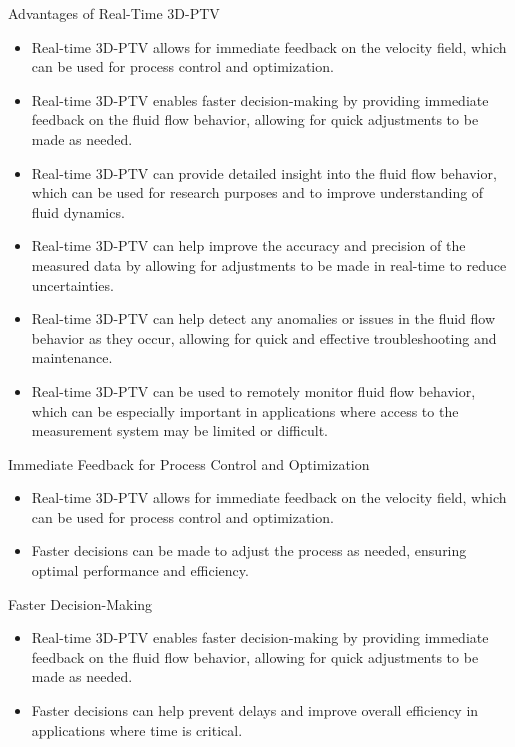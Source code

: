\begin{frame}{Advantages of Real-Time 3D-PTV}

\begin{itemize}
\item Real-time 3D-PTV allows for immediate feedback on the velocity field, which can be used for process control and optimization.
\item Real-time 3D-PTV enables faster decision-making by providing immediate feedback on the fluid flow behavior, allowing for quick adjustments to be made as needed.
\item Real-time 3D-PTV can provide detailed insight into the fluid flow behavior, which can be used for research purposes and to improve understanding of fluid dynamics.
\item Real-time 3D-PTV can help improve the accuracy and precision of the measured data by allowing for adjustments to be made in real-time to reduce uncertainties.
\item Real-time 3D-PTV can help detect any anomalies or issues in the fluid flow behavior as they occur, allowing for quick and effective troubleshooting and maintenance.
\item Real-time 3D-PTV can be used to remotely monitor fluid flow behavior, which can be especially important in applications where access to the measurement system may be limited or difficult.
\end{itemize}

\end{frame}

\begin{frame}{Immediate Feedback for Process Control and Optimization}

\begin{itemize}
\item Real-time 3D-PTV allows for immediate feedback on the velocity field, which can be used for process control and optimization.
\item Faster decisions can be made to adjust the process as needed, ensuring optimal performance and efficiency.
\end{itemize}

\end{frame}

\begin{frame}{Faster Decision-Making}

\begin{itemize}
\item Real-time 3D-PTV enables faster decision-making by providing immediate feedback on the fluid flow behavior, allowing for quick adjustments to be made as needed.
\item Faster decisions can help prevent delays and improve overall efficiency in applications where time is critical.
\end{itemize}

\end{frame}

